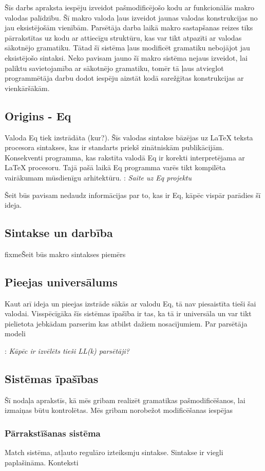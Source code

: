 \documentclass[12pt]{report}
\newcommand{\fixme}[1]{\vskip 5mm\noindent{\bf FIXME}: {\it #1}}
\begin{document}
Šīs darbs apraksta iespēju izveidot pašmodificējošo kodu ar funkcionālās makro valodas palīdzību. Šī makro valoda ļaus izveidot jaunas valodas konstrukcijas no jau eksistējošām vienībām. Parsētāja darba laikā makro sastapšanas reizes tiks pārrakstītas uz kodu ar attiecīgu struktūru, kas var tikt atpazīti ar valodas sākotnējo gramatiku. Tātad šī sistēma ļaus modificēt gramatiku nebojājot jau eksistējošo sintaksi. Neko pavisam jauno šī makro sistēma nejaus izveidot, lai paliktu savietojamība ar sākotnējo gramatiku, tomēr tā ļaus atvieglot programmētāja darbu dodot iespēju aizstāt kodā sarežģītas konstrukcijas ar vienkāršākām. 
\subsection{Origins - Eq}
Valoda Eq tiek izstrādāta (kur?). Šīs valodas sintakse bāzējas uz LaTeX teksta procesora sintakses, kas ir standarts priekš zinātniskām publikācijām. Konsekventi programma, kas rakstīta valodā Eq ir korekti interpretējama ar LaTeX procesoru. Tajā pašā laikā Eq programma varēs tikt kompilēta vairākumam mūsdienīgu arhitektūru. 
\fixme{Saite uz Eq projektu}

Šeit būs pavisam nedaudz informācijas par to, kas ir Eq, kāpēc vispār parādies šī ideja.

\subsection{Sintakse un darbība}
fixme{Šeit būs makro sintakses piemērs} 

\subsection{Pieejas universālums}
Kaut arī ideja un pieejas izstrāde sākās ar valodu Eq, tā nav piesaistīta tieši šai valodai. Visspēcīgāka šīs sistēmas īpašība ir tas, ka tā ir universāla un var tikt pielietota jebkādam parserim kas atbilst dažiem nosacījumiem. 
Par parsētāja modeli

\fixme{Kāpēc ir izvēlēts tieši LL(k) parsētāji?}
\subsection{Sistēmas īpašības}
Šī nodaļa aprakstīs, kā mēs gribam realizēt gramatikas pašmodificēšanos, lai izmaiņas būtu kontrolētas.
Mēs gribam norobežot modificēšanas iespējas

\subsubsection{Pārrakstīšanas sistēma}
Match sistēma, atļauto regulāro izteiksmju sintakse. Sintakse ir viegli paplašināma.
Konteksti
\end{document}
